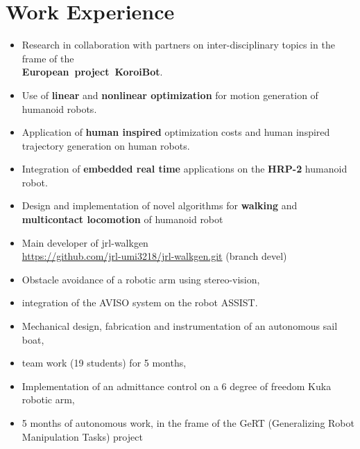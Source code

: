 \documentclass[11pt,a4paper]{moderncv}
\newcommand{\items}{\item[*] \hspace{2mm}}
\begin{document}
\section{Work Experience}
{
\begin{itemize}%
\items Research in collaboration with partners on inter-disciplinary topics in the frame of the\\ \textbf{European~project~KoroiBot}.
\items Use of \textbf{linear} and \textbf{nonlinear optimization} for motion generation of humanoid robots.
\items Application of \textbf{human inspired} optimization costs and human inspired trajectory generation on human robots.
\items Integration of \textbf{embedded real time} applications on the \textbf{HRP-2} humanoid robot.
\items Design and implementation of novel algorithms for \textbf{walking} and \textbf{multicontact locomotion} of humanoid robot
\items Main developer of jrl-walkgen\\ \url{https://github.com/jrl-umi3218/jrl-walkgen.git} (branch devel)
\newline{}
\end{itemize}
}
%
{
\begin{itemize}%
\items Obstacle avoidance of a robotic arm using stereo-vision,
\items integration of the AVISO system on the robot ASSIST.
\newline{}
\end{itemize}
}
%
%
{
\begin{itemize}%
\items Mechanical design, fabrication and instrumentation of an autonomous sail boat,
\items team work (19 students) for 5 months,
\newline{}
\end{itemize}
}
%
%
%
{
\begin{itemize}%
\items Implementation of an admittance control on a 6 degree of freedom Kuka robotic arm,
\items 5 months of autonomous work, in the frame of the GeRT (Generalizing Robot Manipulation Tasks) project
\newline{}
\end{itemize}
}
\end{document}
